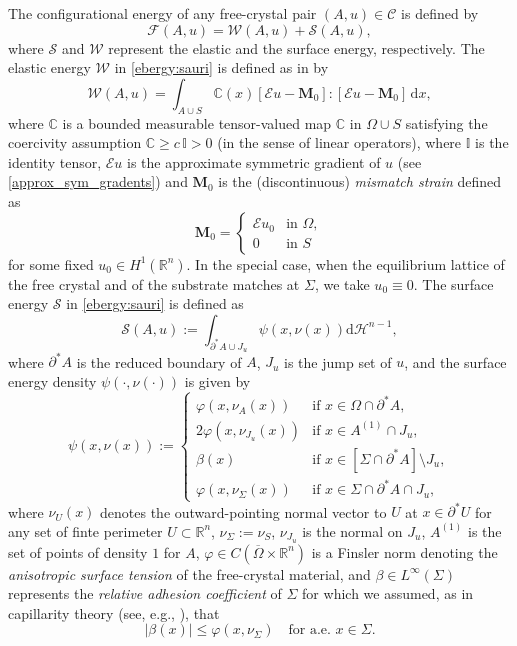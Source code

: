 \documentclass[reqno]{amsart}
\numberwithin{equation}{section}
\theoremstyle{plain}
\theoremstyle{definition}
\newcommand{\C}{\mathbb{C}}
\newcommand{\R}{\mathbb{R}}
\newcommand{\bM}{\mathbf{M}}
\newcommand{\cH}{\mathcal{H}}
\newcommand{\cS}{\mathcal{S}}
\newcommand{\cF}{\mathcal{F}}
\newcommand{\cW}{\mathcal{W}}
\newcommand{\p}{\partial}
\newcommand{\cl}[1]{\overline{#1}}
\renewcommand{\d}{\mathrm{d}}
\newcommand{\str}[1]{\mathcal{E}#1}
\begin{document}
The configurational energy of any free-crystal pair $(A,u)\in\mathcal{C}$ is defined by
\begin{equation}\label{ebergy:sauri}
\cF(A,u) =  \cW(A,u) +\cS(A,u),
\end{equation}
where $\cS$ and $\cW$ represent the  elastic  and the surface energy, respectively. The elastic energy $\cW$ in \eqref{ebergy:sauri} is defined as in \cite{FFLM:2007} by
$$
\cW(A,u) = \int_{A\cup S} \C(x)[\str{u}-\bM_0]:[\str{u}-\bM_0]\,\d x,
$$
where $\C$ is a  bounded measurable tensor-valued map $\C$ in $\Omega\cup S$ satisfying the coercivity assumption $\C\ge c\,\mathbb{I}>0$ (in the sense of linear operators), where $\mathbb{I}$ is the identity tensor, $\str{u}$ is the approximate symmetric gradient of $u$ (see \eqref{approx_sym_gradents}) and 
$
\bM_0
$ 
is the (discontinuous) \emph{mismatch strain} defined as 
\begin{equation}\label{mismatchstrain}
\bM_0 = 
\begin{cases}
\str{u_0} & \text{in $\Omega,$}\\
0 & \text{in $S$}
\end{cases}
\end{equation}
for some fixed $u_0\in H^1(\R^n)$. In the special case, when the equilibrium lattice of the free crystal and of the substrate matches at $\Sigma$, we take $u_0\equiv0$. The surface energy $\cS$ in \eqref{ebergy:sauri} is defined as
$$
\cS(A,u):=\int_{\p^*A \cup J_u} \psi(x,\nu(x))\d\cH^{n-1},
$$
where $\p^*A$ is the reduced boundary of $A$, $J_u$ is the jump set of $u$, and the surface energy density $\psi(\cdot,\nu(\cdot))$  is given by 
\begin{equation}\label{surergy}
\psi(x,\nu(x)):=
\begin{cases}
\varphi(x,\nu_A(x)) & \text{if $x\in \Omega\cap \p^*A,$}\\
2\varphi(x,\nu_{J_u}(x)) & \text{if $x\in A^{(1)}\cap J_u,$}\\
\beta(x) & \text{if $x\in [\Sigma\cap \p^*A]\setminus J_u,$}\\
\varphi(x,\nu_\Sigma(x)) & \text{if $x\in \Sigma\cap \p^*A \cap J_u$,}
\end{cases}
\end{equation}
where $\nu_U(x)$  denotes the outward-pointing normal vector to $U$ at $x\in\p^*U$ for any set of finte perimeter $U\subset\R^n$, $\nu_\Sigma:=\nu_S$, $\nu_{J_u}$ is the  normal on $J_u$,  $A^{(1)}$   is the set of points of density $1$ for $A$, $\varphi\in C(\cl{\Omega}\times \R^n)$ is a Finsler norm denoting the  \emph{anisotropic surface tension}   of the free-crystal material, and  $\beta\in L^\infty(\Sigma)$ represents the  \emph{relative adhesion coefficient} of $\Sigma$ for which we assumed, as in capillarity theory (see, e.g., \cite{DPhM:2015}), that
\begin{equation*}
|\beta(x)| \le \varphi(x,\nu_\Sigma)\quad\text{for a.e.\ $x\in\Sigma$.} 
\end{equation*}
%
\end{document}
